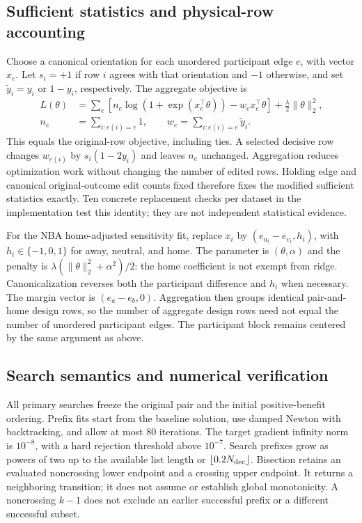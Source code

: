 \subsection{Sufficient statistics and physical-row accounting}
Choose a canonical orientation for each unordered participant edge $e$, with vector $x_e$. Let $s_i=+1$ if row $i$ agrees with that orientation and $-1$ otherwise, and set $\tilde y_i=y_i$ or $1-y_i$, respectively. The aggregate objective is
\begin{equation}
\begin{aligned}
L(\theta)&=\sum_e\left[n_e\log(1+\exp(x_e^\top\theta))-w_e x_e^\top\theta\right]
+\frac{\lambda}{2}\|\theta\|_2^2,\\
n_e&=\sum_{i:e(i)=e}1,\qquad w_e=\sum_{i:e(i)=e}\tilde y_i.
\end{aligned}
\label{eq:aggregate}
\end{equation}
This equals the original-row objective, including ties. A selected decisive row changes $w_{e(i)}$ by $s_i(1-2y_i)$ and leaves $n_e$ unchanged. Aggregation reduces optimization work without changing the number of edited rows. Holding edge and canonical original-outcome edit counts fixed therefore fixes the modified sufficient statistics exactly. Ten concrete replacement checks per dataset in the implementation test this identity; they are not independent statistical evidence.

For the NBA home-adjusted sensitivity fit, replace $x_i$ by $(e_{u_i}-e_{v_i},h_i)$, with $h_i\in\{-1,0,1\}$ for away, neutral, and home. The parameter is $(\theta,\alpha)$ and the penalty is $\lambda(\|\theta\|_2^2+\alpha^2)/2$: the home coefficient is not exempt from ridge. Canonicalization reverses both the participant difference and $h_i$ when necessary. The margin vector is $(e_a-e_b,0)$. Aggregation then groups identical pair-and-home design rows, so the number of aggregate design rows need not equal the number of unordered participant edges. The participant block remains centered by the same argument as above.

\subsection{Search semantics and numerical verification}
All primary searches freeze the original pair and the initial positive-benefit ordering. Prefix fits start from the baseline solution, use damped Newton with backtracking, and allow at most 80 iterations. The target gradient infinity norm is $10^{-8}$, with a hard rejection threshold above $10^{-7}$. Search prefixes grow as powers of two up to the available list length or $\lfloor0.2N_{\rm dec}\rfloor$. Bisection retains an evaluated noncrossing lower endpoint and a crossing upper endpoint. It returns a neighboring transition; it does not assume or establish global monotonicity. A noncrossing $k-1$ does not exclude an earlier successful prefix or a different successful subset.

